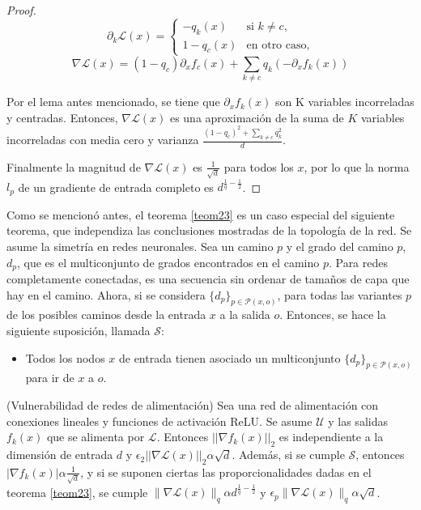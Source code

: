 \begin{proof}
$$\partial_k \mathcal{L}(x)= \begin{cases} 
-q_k(x) & \text{si } k \neq c, \\
1-q_c(x) & \text{en otro caso},\end{cases}$$
$$\nabla \mathcal{L}(x)=(1-q_c)\partial_x f_c(x) + \sum_{k \neq c} q_k(-\partial_x f_k(x))$$

Por el lema antes mencionado, se tiene que $\partial_x f_k(x)$ son K variables incorreladas y centradas. Entonces, $\nabla \mathcal{L}(x)$ es una aproximación de la suma de $K$ variables incorreladas con media cero y varianza $\frac{(1-q_c)^2 + \sum_{k \neq c} q_k^2}{d}$.

Finalmente la magnitud de $\nabla \mathcal{L}(x)$ es $\frac{1}{\sqrt{d}}$ para todos los $x$, por lo que la norma $l_p$ de un gradiente de entrada completo es $d^{\frac{1}{q}-\frac{1}{2}}$.
\end{proof}

Como se mencionó antes, el teorema \ref{teom23} es un caso especial del siguiente teorema, que independiza las conclusiones mostradas de la topología de la red. Se asume la simetría en redes neuronales. Sea un camino $p$ y el grado del camino $p$,$d_p$, que es el multiconjunto de grados encontrados en el camino $p$. Para redes completamente conectadas, es una secuencia sin ordenar de tamaños de capa que hay en el camino. Ahora, si se considera $\{d_p\}_{p\in\mathcal{P}(x,o)}$, para todas las variantes $p$ de los posibles caminos desde la entrada $x$ a la salida $o$. Entonces, se hace la siguiente suposición, llamada $\mathcal{S}$:
\begin{itemize}
	\item Todos los nodos $x$ de entrada tienen asociado un multiconjunto $\{d_p\}_{p\in \mathcal{P}(x,o)}$ para ir de $x$ a $o$.
\end{itemize}

\begin{teorema}(Vulnerabilidad de redes de alimentación) \label{teom24}
Sea una red de alimentación con conexiones lineales y funciones de activación ReLU. Se asume $\mathcal{U}$ y las salidas $f_k(x)$ que se alimenta por $\mathcal{L}$. Entonces $||\nabla f_k(x)||_2$ es independiente a la dimensión de entrada $d$ y $\epsilon_2 ||\nabla \mathcal{L}(x)||_2 \alpha \sqrt{d}$. Además, si se cumple $\mathcal{S}$, entonces $|\nabla f_k(x)|\alpha \frac{1}{\sqrt{d}}$, y si se suponen ciertas las proporcionalidades dadas en el teorema \ref{teom23}, se cumple $\| \nabla \mathcal{L}(x) \|_q \alpha d^{\frac{1}{q}-\frac{1}{2}}$ y $\epsilon_p \| \nabla \mathcal{L}(x) \|_q \alpha \sqrt{d}$.
\end{teorema}

